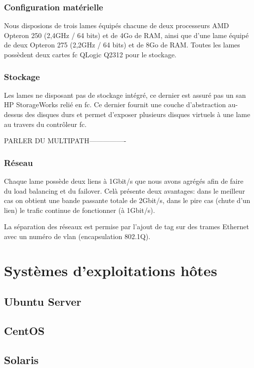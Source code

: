 \documentclass[a4paper,oneside]{report}
\begin{document}
\subsection{Configuration matérielle}
Nous disposions de trois lames équipés chacune de deux processeurs AMD Opteron 250 (2,4GHz / 64 bits) et de 4Go de RAM, ainsi que d'une lame équipé de deux Opteron 275 (2,2GHz / 64 bits) et de 8Go de RAM.\newline
Toutes les lames possèdent deux cartes \gls{fc} QLogic Q2312 pour le stockage.

\subsection{Stockage}
Les lames ne disposant pas de stockage intégré, ce dernier est assuré pas un \gls{san} HP StorageWorks relié en \gls{fc}.
Ce dernier fournit une couche d'abstraction au-dessus des disques durs et permet d'exposer plusieurs disques \og virtuels \fg à une lame au travers du contrôleur \gls{fc}.

PARLER DU MULTIPATH----------------

\subsection{Réseau}
Chaque lame possède deux liens à 1Gbit/s que nous avons agrégés afin de faire du load balancing et du failover. Celà présente deux avantages: dans le meilleur cas on obtient une bande passante totale de 2Gbit/s, dans le pire cas (chute d'un lien) le trafic continue de fonctionner (à 1Gbit/s).

La séparation des réseaux est permise par l'ajout de tag sur des trames Ethernet avec un numéro de \gls{vlan} (encapsulation 802.1Q).


\chapter{Systèmes d'exploitations hôtes}
\section{Ubuntu Server} \label{cha:ubuntu}

\section{CentOS}

\section{Solaris}
\end{document}
